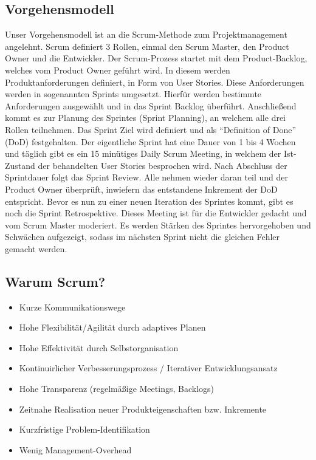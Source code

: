 \documentclass[a4paper,11pt]{scrartcl}
\begin{document}
\subsection{Vorgehensmodell}
Unser Vorgehensmodell ist an die Scrum-Methode zum Projektmanagement angelehnt.
Scrum definiert 3 Rollen, einmal den Scrum Master, den Product Owner und die Entwickler.
Der Scrum-Prozess startet mit dem Product-Backlog, welches vom Product Owner geführt wird.
In diesem werden Produktanforderungen definiert, in Form von User Stories.
Diese Anforderungen werden in sogenannten Sprints umgesetzt.
Hierfür werden bestimmte Anforderungen ausgewählt und in das Sprint Backlog überführt.
Anschließend kommt es zur Planung des Sprintes (Sprint Planning),
an welchem alle drei Rollen teilnehmen. Das Sprint Ziel wird definiert und
als "`Definition of Done"' (DoD) festgehalten.
Der eigentliche Sprint hat eine Dauer von 1 bis 4 Wochen und täglich gibt es ein 15 minütiges Daily Scrum Meeting,
in welchem der Ist-Zustand der behandelten User Stories besprochen wird.
Nach Abschluss der Sprintdauer folgt das Sprint Review.
Alle nehmen wieder daran teil und der Product Owner überprüft,
inwiefern das entstandene Inkrement der DoD entspricht.
Bevor es nun zu einer neuen Iteration des Sprintes kommt,
gibt es noch die Sprint Retrospektive.
Dieses Meeting ist für die Entwickler gedacht und vom Scrum Master moderiert.
Es werden Stärken des Sprintes hervorgehoben und Schwächen aufgezeigt,
sodass im nächsten Sprint nicht die gleichen Fehler gemacht werden.

\subsection{Warum Scrum?}
\begin{itemize}
\item Kurze Kommunikationswege
\item Hohe Flexibilität/Agilität durch adaptives Planen
\item Hohe Effektivität durch Selbstorganisation
\item Kontinuirlicher Verbesserungsprozess / Iterativer Entwicklungsansatz
\item Hohe Transparenz (regelmäßige Meetings, Backlogs)
\item Zeitnahe Realisation neuer Produkteigenschaften bzw. Inkremente
\item Kurzfristige Problem-Identifikation
\item Wenig Management-Overhead
\end{itemize}
\end{document}

